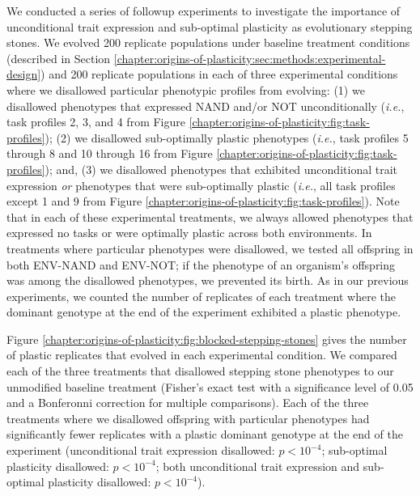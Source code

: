 We conducted a series of followup experiments to investigate the importance of unconditional trait expression and sub-optimal plasticity as evolutionary stepping stones.
We evolved 200 replicate populations under baseline treatment conditions (described in Section \ref{chapter:origins-of-plasticity:sec:methods:experimental-design}) and 200 replicate populations in each of three experimental conditions where we disallowed particular phenotypic profiles from evolving: (1) we disallowed phenotypes that expressed NAND and/or NOT unconditionally (\textit{i.e.}, task profiles 2, 3, and 4 from Figure \ref{chapter:origins-of-plasticity:fig:task-profiles}); (2) we disallowed sub-optimally plastic phenotypes (\textit{i.e.}, task profiles 5 through 8 and 10 through 16 from Figure \ref{chapter:origins-of-plasticity:fig:task-profiles}); and, (3) we disallowed phenotypes that exhibited unconditional trait expression \textit{or} phenotypes that were sub-optimally plastic (\textit{i.e.}, all task profiles except 1 and 9 from Figure \ref{chapter:origins-of-plasticity:fig:task-profiles}).
Note that in each of these experimental treatments, we always allowed phenotypes that expressed no tasks or were optimally plastic across both environments.
In treatments where particular phenotypes were disallowed, we tested all offspring in both ENV-NAND and ENV-NOT; if the phenotype of an organism's offspring was among the disallowed phenotypes, we prevented its birth.
As in our previous experiments, we counted the number of replicates of each treatment where the dominant genotype at the end of the experiment exhibited a plastic phenotype.



Figure \ref{chapter:origins-of-plasticity:fig:blocked-stepping-stones} gives the number of plastic replicates that evolved in each experimental condition.
We compared each of the three treatments that disallowed stepping stone phenotypes to our unmodified baseline treatment (Fisher's exact test with a significance level of 0.05 and a Bonferonni correction for multiple comparisons).
Each of the three treatments where we disallowed offspring with particular phenotypes had significantly fewer replicates with a plastic dominant genotype at the end of the experiment (unconditional trait expression disallowed: $p<10^{-4}$; sub-optimal plasticity disallowed: $p<10^{-4}$; both unconditional trait expression and sub-optimal plasticity disallowed: $p<10^{-4}$).

